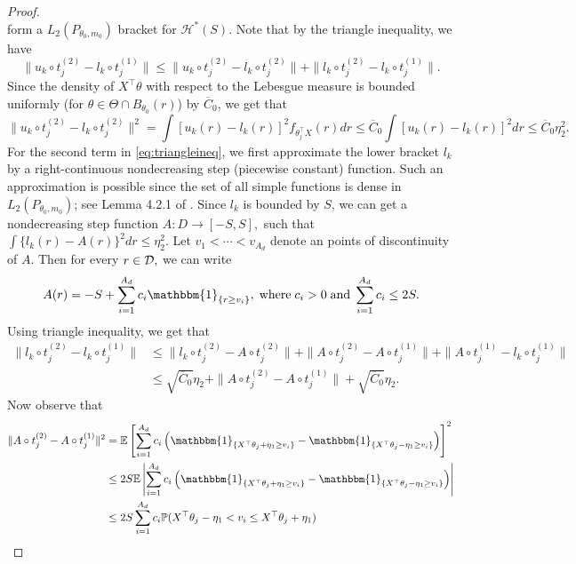 {\begin{proof}
\[\] form a $L_2(P_{\theta_0,m_0})$ bracket for $\mathcal{H}^*(S).$  Note that by the triangle inequality, we have
\begin{equation}\label{eq:triangleineq}
\|u_k\circ t_j^{(2)} - l_k\circ t_j^{(1)}\| \le \|u_k\circ t_j^{(2)} - l_k\circ t_j^{(2)}\| + \|l_k\circ t_j^{(2)} - l_k\circ t_j^{(1)}\|.
\end{equation}
Since the density  of $X^{\top}\theta$  with respect to the Lebesgue measure is  bounded uniformly (for $\theta \in \Theta\cap B_{\theta_0}(r)$)  by $\overline{C}_0$, we get that
\[
\|u_k\circ t_j^{(2)} - l_k\circ t_j^{(2)}\|^2 = \int \left[u_k(r) - l_k(r)\right]^2 f_{\theta_j^{\top}X}(r)dr \le \overline{C}_0\int \left[u_k(r) - l_k(r)\right]^2 dr \le \overline{C}_0\eta_2^2.
\]
For the second term in \eqref{eq:triangleineq}, we first approximate the lower bracket $l_k$ by a right-continuous nondecreasing step (piecewise constant) function. Such an approximation is possible since the set of all simple functions is dense in $L_2(P_{\theta_0,m_0})$; see Lemma 4.2.1 of \cite{Bogachev}. Since $l_k$ is bounded by $S$, we can get a nondecreasing step function $A: D\to [-S, S],$ such that $\int \{l_k(r) - A(r)\}^2dr \le \eta_2^2$. Let $v_1<\cdots< v_{A_d}$ denote an points of discontinuity of $A$.
Then for every $r\in \mathcal{D},$ we can write
\[
A(r) = -S+ \sum_{i =1}^{A_d} c_i\mathbbm{1}_{\{r\ge v_i\}},\;\mbox{where}\; c_i>0 \;\text{and}\; \sum_{i=1}^{A_d}c_i \le 2S.
\]
 Using triangle inequality, we get that
\begin{align*}
\|l_k\circ t_j^{(2)} - l_k\circ t_j^{(1)}\| &\le \|l_k\circ t_j^{(2)} - A\circ t_j^{(2)}\| + \|A\circ t_j^{(2)} - A\circ t_j^{(1)}\| + \|A\circ t_j^{(1)} - l_k\circ t_j^{(1)}\|\\
&\le \sqrt{\overline{C}_0}\eta_2 + \|A\circ t_j^{(2)} - A\circ t_j^{(1)}\| + \sqrt{\overline{C}_0}\eta_2.
\end{align*}
 Now observe that
\begin{align*}
\|A\circ t_j^{(2)} - A\circ t_j^{(1)}\|^2 &= \mathbb{E}\left[\sum_{i =1}^{A_d} c_i\left(\mathbbm{1}_{\{X^{\top}\theta_j + \eta_1 \ge v_i\}} - \mathbbm{1}_{\{X^{\top}\theta_j - \eta_1 \ge v_i\}}\right)\right]^2\\
&\le 2S\mathbb{E}\left|\sum_{i =1}^{A_d}c_i\left(\mathbbm{1}_{\{X^{\top}\theta_j + \eta_1 \ge v_i\}} - \mathbbm{1}_{\{X^{\top}\theta_j - \eta_1 \ge v_i\}}\right)\right|\\
&\le 2S\sum_{i =1}^{A_d} c_i\mathbb{P}(X^{\top}\theta_j -\eta_1 < v_i \le X^{\top}\theta_j + \eta_1)\\

\end{align*}
\end{proof}}
